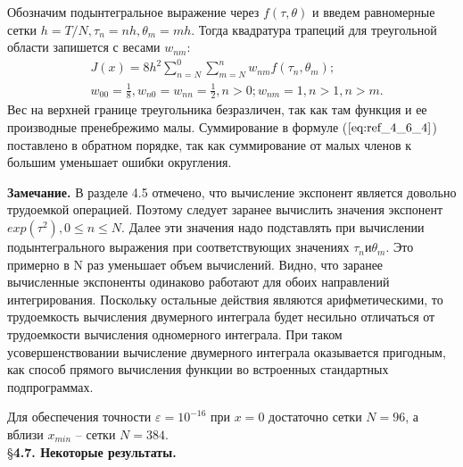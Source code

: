 Обозначим подынтегральное выражение через $f(\tau, \theta)$ и введем
равномерные сетки $h = T/N, \tau_n = nh, \theta_m = mh$. Тогда квадратура трапеций для
треугольной области запишется с весами $w_{nm}$:
\begin{equation}
\begin{aligned}
&J(x)=8h^2 \sum_{n=N}^0 \sum_{m=N}^n w_{nm} f(\tau_n, \theta_m); \\
&w_{00}=\frac{1}{8}, w_{n0}=w_{nn}=\frac{1}{2},n>0;w_{nm}=1,n>1,n>m.
\end{aligned}
\label{eq:ref_4_6_4}
\end{equation}
Вес на верхней границе треугольника безразличен, так как там функция и ее
производные пренебрежимо малы. Суммирование в формуле ($\ref{eq:ref_4_6_4}$) поставлено в
обратном порядке, так как суммирование от малых членов к большим
уменьшает ошибки округления.

\textbf{Замечание.} В разделе 4.5 отмечено, что вычисление экспонент является довольно трудоемкой
операцией. Поэтому следует заранее вычислить значения экспонент $exp(\tau^2), 0 \leqslant n \leqslant N$. Далее эти значения надо подставлять при вычислении
подынтегрального выражения при соответствующих значениях $\tau_n и \theta_m$. Это
примерно в  N раз уменьшает объем вычислений. Видно, что заранее
вычисленные экспоненты одинаково работают для обоих направлений
интегрирования. Поскольку остальные действия являются арифметическими, то
трудоемкость вычисления двумерного интеграла будет несильно отличаться от
трудоемкости вычисления одномерного интеграла. При таком
усовершенствовании вычисление двумерного интеграла оказывается
пригодным, как способ прямого вычисления функции во встроенных
стандартных подпрограммах.

Для обеспечения точности $\varepsilon = 10^{-16}$ при $x = 0$ достаточно сетки $N = 96$, а
вблизи $x_{min}$ – сетки $N = 384$.
\\

\S \textbf{4.7. Некоторые результаты.}
\\


